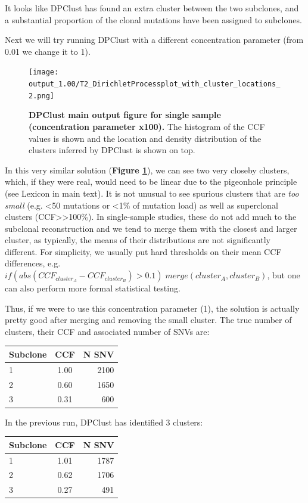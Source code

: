 \documentclass[]{article}
\begin{document}
It looks like DPClust has found an extra cluster between the two
subclones, and a substantial proportion of the clonal mutations have
been assigned to subclones.

Next we will try running DPClust with a different concentration
parameter (from 0.01 we change it to 1).

\begin{figure}[H]
  \centering
  \texttt{[image: output\_1.00/T2\_DirichletProcessplot\_with\_cluster\_locations\_2.png]}
  \caption{\textbf{DPClust main output figure for single sample (concentration parameter x100).}
  The histogram of the CCF values is shown and the location and
  density distribution of the clusters inferred by DPClust is shown on top.}
  \label{Figure7}
\end{figure}

In this very similar solution (\textbf{Figure \ref{Figure7}}), we can
see two very closeby clusters, which, if they were real, would need to
be linear due to the pigeonhole principle (see Lexicon in main text). It
is not unusual to see spurious clusters that are \emph{too small} (e.g.
\textless{}50 mutations or \textless{}1\% of mutation load) as well as
superclonal clusters (CCF\textgreater{}\textgreater{}100\%). In
single-sample studies, these do not add much to the subclonal
reconstruction and we tend to merge them with the closest and larger
cluster, as typically, the means of their distributions are not
significantly different. For simplicity, we usually put hard thresholds
on their mean CCF differences, e.g.
\(if(abs(CCF_{cluster_A}-CCF_{cluster_B})>0.1)\;merge(cluster_A,cluster_B)\),
but one can also perform more formal statistical testing.

Thus, if we were to use this concentration parameter (1), the solution
is actually pretty good after merging and removing the small cluster.
The true number of clusters, their CCF and associated number of SNVs
are:

\begin{longtable}[]{@{}lcr@{}}
\toprule
Subclone & CCF & N SNV\tabularnewline
\midrule
\endhead
1 & 1.00 & 2100\tabularnewline
2 & 0.60 & 1650\tabularnewline
3 & 0.31 & 600\tabularnewline
\bottomrule
\end{longtable}

\newpage

In the previous run, DPClust has identified 3 clusters:

\begin{longtable}[]{@{}lcr@{}}
\toprule
Subclone & CCF & N SNV\tabularnewline
\midrule
\endhead
1 & 1.01 & 1787\tabularnewline
2 & 0.62 & 1706\tabularnewline
3 & 0.27 & 491\tabularnewline
\bottomrule
\end{longtable}
\end{document}
